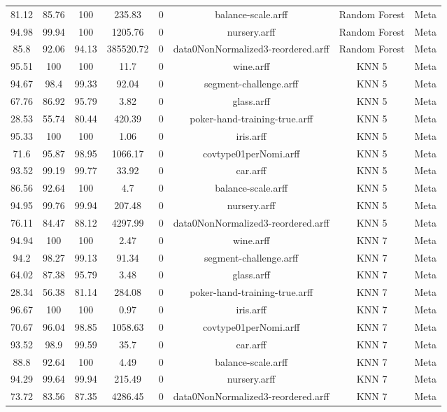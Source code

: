 \begin{longtable}{@{\extracolsep{}}cccccccc}
81.12	&	85.76	&	100	&	235.83	&	0	&	 balance-scale.arff	&	 Random Forest	&	Meta	\\
94.98	&	99.94	&	100	&	1205.76	&	0	&	 nursery.arff	&	 Random Forest	&	Meta	\\
85.8	&	92.06	&	94.13	&	385520.72	&	0	&	 data0NonNormalized3-reordered.arff	&	 Random Forest	&	Meta	\\
95.51	&	100	&	100	&	11.7	&	0	&	 wine.arff	&	 KNN 5	&	Meta	\\
94.67	&	98.4	&	99.33	&	92.04	&	0	&	 segment-challenge.arff	&	 KNN 5	&	Meta	\\
67.76	&	86.92	&	95.79	&	3.82	&	0	&	 glass.arff	&	 KNN 5	&	Meta	\\
28.53	&	55.74	&	80.44	&	420.39	&	0	&	 poker-hand-training-true.arff	&	 KNN 5	&	Meta	\\
95.33	&	100	&	100	&	1.06	&	0	&	 iris.arff	&	 KNN 5	&	Meta	\\
71.6	&	95.87	&	98.95	&	1066.17	&	0	&	 covtype01perNomi.arff	&	 KNN 5	&	Meta	\\
93.52	&	99.19	&	99.77	&	33.92	&	0	&	 car.arff	&	 KNN 5	&	Meta	\\
86.56	&	92.64	&	100	&	4.7	&	0	&	 balance-scale.arff	&	 KNN 5	&	Meta	\\
94.95	&	99.76	&	99.94	&	207.48	&	0	&	 nursery.arff	&	 KNN 5	&	Meta	\\
76.11	&	84.47	&	88.12	&	4297.99	&	0	&	 data0NonNormalized3-reordered.arff	&	 KNN 5	&	Meta	\\
94.94	&	100	&	100	&	2.47	&	0	&	 wine.arff	&	 KNN 7	&	Meta	\\
94.2	&	98.27	&	99.13	&	91.34	&	0	&	 segment-challenge.arff	&	 KNN 7	&	Meta	\\
64.02	&	87.38	&	95.79	&	3.48	&	0	&	 glass.arff	&	 KNN 7	&	Meta	\\
28.34	&	56.38	&	81.14	&	284.08	&	0	&	 poker-hand-training-true.arff	&	 KNN 7	&	Meta	\\
96.67	&	100	&	100	&	0.97	&	0	&	 iris.arff	&	 KNN 7	&	Meta	\\
70.67	&	96.04	&	98.85	&	1058.63	&	0	&	 covtype01perNomi.arff	&	 KNN 7	&	Meta	\\
93.52	&	98.9	&	99.59	&	35.7	&	0	&	 car.arff	&	 KNN 7	&	Meta	\\
88.8	&	92.64	&	100	&	4.49	&	0	&	 balance-scale.arff	&	 KNN 7	&	Meta	\\
94.29	&	99.64	&	99.94	&	215.49	&	0	&	 nursery.arff	&	 KNN 7	&	Meta	\\
73.72	&	83.56	&	87.35	&	4286.45	&	0	&	 data0NonNormalized3-reordered.arff	&	 KNN 7	&	Meta	\\

\end{longtable}
